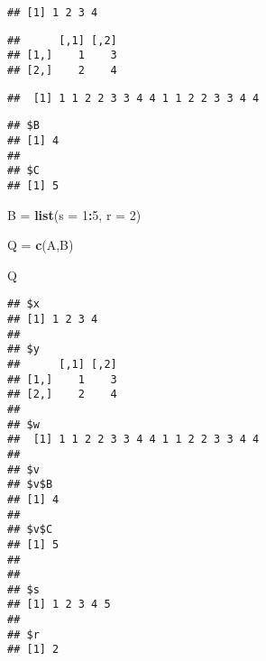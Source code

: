 \documentclass[]{article}
\newenvironment{Shaded}{\begin{snugshade}}{\end{snugshade}}
\newcommand{\KeywordTok}[1]{\textcolor[rgb]{0.13,0.29,0.53}{\textbf{#1}}}
\newcommand{\DataTypeTok}[1]{\textcolor[rgb]{0.13,0.29,0.53}{#1}}
\newcommand{\DecValTok}[1]{\textcolor[rgb]{0.00,0.00,0.81}{#1}}
\newcommand{\StringTok}[1]{\textcolor[rgb]{0.31,0.60,0.02}{#1}}
\newcommand{\OperatorTok}[1]{\textcolor[rgb]{0.81,0.36,0.00}{\textbf{#1}}}
\newcommand{\NormalTok}[1]{#1}
\begin{document}
\begin{Shaded}
\end{Shaded}

\begin{verbatim}
## [1] 1 2 3 4
\end{verbatim}

\begin{Shaded}
\end{Shaded}

\begin{verbatim}
##      [,1] [,2]
## [1,]    1    3
## [2,]    2    4
\end{verbatim}

\begin{Shaded}
\end{Shaded}

\begin{verbatim}
##  [1] 1 1 2 2 3 3 4 4 1 1 2 2 3 3 4 4
\end{verbatim}

\begin{Shaded}
\end{Shaded}

\begin{verbatim}
## $B
## [1] 4
## 
## $C
## [1] 5
\end{verbatim}

\begin{Shaded}
\begin{Highlighting}[]
\NormalTok{B =}\StringTok{ }\KeywordTok{list}\NormalTok{(}\DataTypeTok{s =} \DecValTok{1}\OperatorTok{:}\DecValTok{5}\NormalTok{, }\DataTypeTok{r =} \DecValTok{2}\NormalTok{)}

\NormalTok{Q =}\StringTok{ }\KeywordTok{c}\NormalTok{(A,B)}

\NormalTok{Q}
\end{Highlighting}
\end{Shaded}

\begin{verbatim}
## $x
## [1] 1 2 3 4
## 
## $y
##      [,1] [,2]
## [1,]    1    3
## [2,]    2    4
## 
## $w
##  [1] 1 1 2 2 3 3 4 4 1 1 2 2 3 3 4 4
## 
## $v
## $v$B
## [1] 4
## 
## $v$C
## [1] 5
## 
## 
## $s
## [1] 1 2 3 4 5
## 
## $r
## [1] 2
\end{verbatim}
\end{document}
